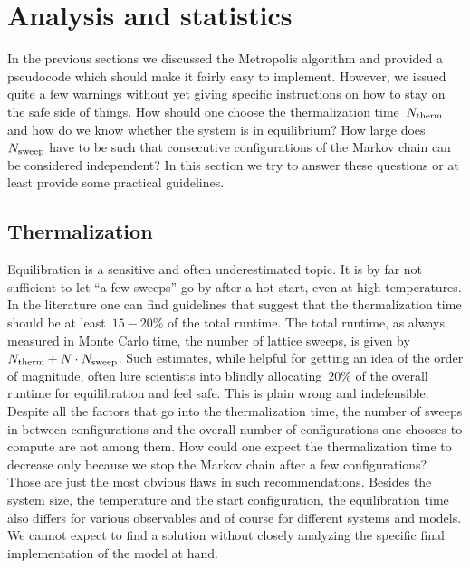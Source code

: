 %
\section{Analysis and statistics}\label{sec:analysis}
%
In the previous sections we discussed the Metropolis algorithm and provided a
pseudocode which should make it fairly easy to implement. However, we issued
quite a few warnings without yet giving specific instructions on how to stay on
the safe side of things. How should one choose the thermalization time~$N_{\mathrm{therm}}$
and how do we know whether the system is in equilibrium? How large
does~$N_{\mathrm{sweep}}$ have to be such that consecutive configurations of the Markov
chain can be considered independent? In this section we try to answer these
questions or at least provide some practical guidelines.

\subsection{Thermalization}

Equilibration is a sensitive and often underestimated topic. It is by far not
sufficient to let ``a few sweeps'' go by after a hot start, even at high
temperatures. In the literature one can find guidelines that suggest that the
thermalization time should be at least~$15-20$\% of the total runtime. The total
runtime, as always measured in Monte Carlo time, \ie{} the number of lattice
sweeps, is given by~$N_{\mathrm{therm}} + N\cdot N_{\mathrm{sweep}}$. Such estimates, while helpful
for getting an idea of the order of magnitude, often lure scientists into
blindly allocating~$20$\% of the overall runtime for equilibration and feel
safe. This is plain wrong and indefensible. Despite all the factors that go into
the thermalization time, the number of sweeps in between configurations and the
overall number of configurations one chooses to compute are not among them. How
could one expect the thermalization time to decrease only because we stop the
Markov chain after a few configurations? Those are just the most obvious flaws
in such recommendations. Besides the system size, the temperature and the start
configuration, the equilibration time also differs for various observables and
of course for different systems and models. We cannot expect to find a solution
without closely analyzing the specific final implementation of the model at
hand.

